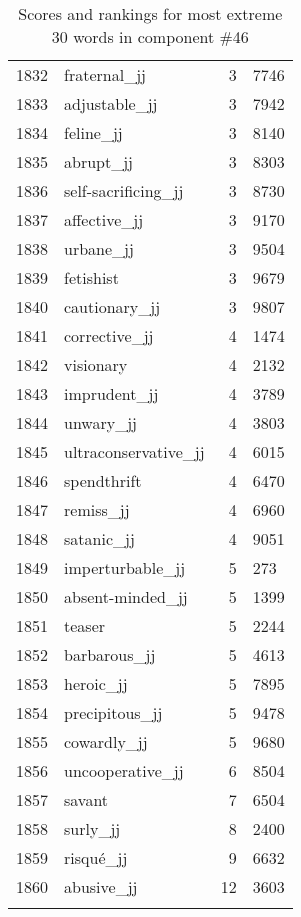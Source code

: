 \begin{longtable}[!htbp]{| rlr@{.}l |}
    1832 & fraternal\_jj & 3 & 7746 \\
    1833 & adjustable\_jj & 3 & 7942 \\
    1834 & feline\_jj & 3 & 8140 \\
    1835 & abrupt\_jj & 3 & 8303 \\
    1836 & self-sacrificing\_jj & 3 & 8730 \\
    1837 & affective\_jj & 3 & 9170 \\
    1838 & urbane\_jj & 3 & 9504 \\
    1839 & fetishist & 3 & 9679 \\
    1840 & cautionary\_jj & 3 & 9807 \\
    1841 & corrective\_jj & 4 & 1474 \\
    1842 & visionary & 4 & 2132 \\
    1843 & imprudent\_jj & 4 & 3789 \\
    1844 & unwary\_jj & 4 & 3803 \\
    1845 & ultraconservative\_jj & 4 & 6015 \\
    1846 & spendthrift & 4 & 6470 \\
    1847 & remiss\_jj & 4 & 6960 \\
    1848 & satanic\_jj & 4 & 9051 \\
    1849 & imperturbable\_jj & 5 & 273 \\
    1850 & absent-minded\_jj & 5 & 1399 \\
    1851 & teaser & 5 & 2244 \\
    1852 & barbarous\_jj & 5 & 4613 \\
    1853 & heroic\_jj & 5 & 7895 \\
    1854 & precipitous\_jj & 5 & 9478 \\
    1855 & cowardly\_jj & 5 & 9680 \\
    1856 & uncooperative\_jj & 6 & 8504 \\
    1857 & savant & 7 & 6504 \\
    1858 & surly\_jj & 8 & 2400 \\
    1859 & risqué\_jj & 9 & 6632 \\
    1860 & abusive\_jj & 12 & 3603 \\
    \hline
    \caption{Scores and rankings for most extreme 30 words in component \#46} \\
\end{longtable}
